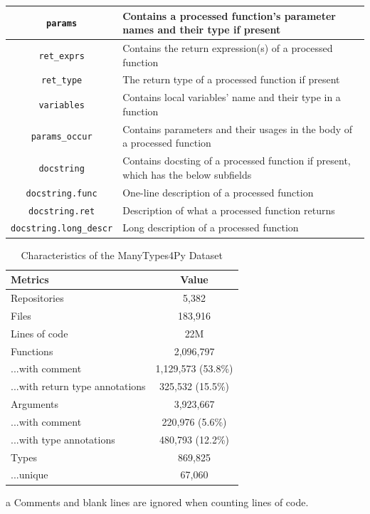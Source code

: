 \documentclass[10pt, conference]{IEEEtran}
\begin{document}
\begin{table}[t]
\begin{tabular}{c l}
		\midrule
		\texttt{params} & Contains a processed function's parameter names and their type if present \\
		\midrule
		\texttt{ret\_exprs} & Contains the return expression(s) of a processed function \\
		\midrule
		\texttt{ret\_type} & The return type of a processed function if present \\
		\midrule
		\texttt{variables} & Contains local variables' name and their type in a function \\
		\midrule
		\texttt{params\_occur} & Contains parameters and their usages in the body of a processed function \\
		\midrule
		\texttt{docstring} & Contains docsting of a processed function if present, which has the below subfields \\
		\midrule
		\texttt{docstring.func} & One-line description of a processed function \\
		\midrule
		\texttt{docstring.ret} & Description of what a processed function returns \\
		\midrule
		\texttt{docstring.long\_descr} & Long description of a processed function \\
		\bottomrule
	\end{tabular}
\end{table}

\begin{table}
	\centering
	\caption{Characteristics of the ManyTypes4Py Dataset}
	\begin{threeparttable}
		\begin{tabular}{l c}
			\toprule
			Metrics & Value \\
			\midrule
			Repositories & 5,382 \\
			Files & 183,916 \\
			Lines of code\tnote{a} & 22M \\
			\midrule
			Functions & 2,096,797 \\
			...with comment & 1,129,573 (53.8\%) \\
			...with return type annotations & 325,532 (15.5\%)  \\
			\midrule
			Arguments & 3,923,667 \\
			...with comment & 220,976 (5.6\%) \\ 
			...with type annotations & 480,793 (12.2\%) \\
			\midrule
			Types & 869,825 \\
			...unique & 67,060 \\
			\bottomrule
		\end{tabular}
		\begin{tablenotes}
			\item[a] {\footnotesize Comments and blank lines are ignored when counting lines of code.}
		\end{tablenotes}
	\end{threeparttable}
\end{table}
\end{document}
